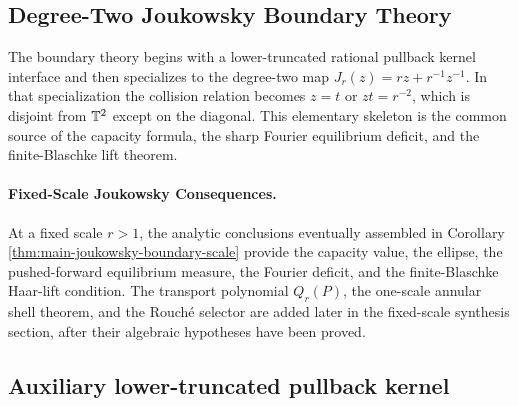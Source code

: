 \subsection{Degree-Two Joukowsky Boundary Theory}\label{subsec:main-joukowsky-boundary-scale}

The boundary theory begins with a lower-truncated rational pullback
kernel interface and then specializes to the degree-two map
\(J_r(z)=rz+r^{-1}z^{-1}\).  In that specialization the collision
relation becomes \(z=t\) or \(zt=r^{-2}\), which is disjoint from
\(\mathbb{T}^2\) except on the diagonal.  This elementary skeleton is the
common source of the capacity formula, the sharp Fourier equilibrium
deficit, and the finite-Blaschke lift theorem.

\paragraph{Fixed-Scale Joukowsky Consequences.}\label{par:fixed-scale-joukowsky-package-scope}
At a fixed scale \(r>1\), the analytic conclusions eventually assembled
in Corollary \ref{thm:main-joukowsky-boundary-scale} provide the capacity
value, the ellipse, the pushed-forward equilibrium measure, the Fourier
deficit, and the finite-Blaschke Haar-lift condition.  The transport
polynomial \(Q_r(P)\), the one-scale annular shell theorem, and the
Rouch\'e selector are added later in the fixed-scale synthesis section,
after their algebraic hypotheses have been proved.

\subsection{Auxiliary lower-truncated pullback kernel}\label{subsec:degree-two-joukowsky-specialization}

